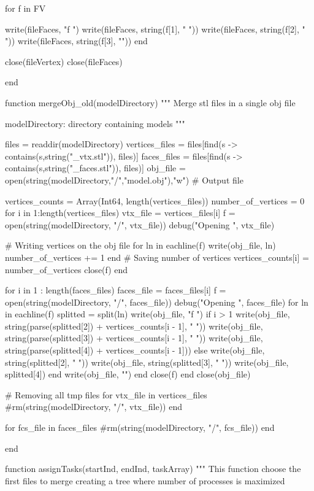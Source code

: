 \documentclass[11pt,oneside]{article}	%
\begin{document}
{  for f in FV

    write(fileFaces, "f ")
    write(fileFaces, string(f[1], " "))
    write(fileFaces, string(f[2], " "))
    write(fileFaces, string(f[3], "\n"))
  end

  close(fileVertex)
  close(fileFaces)

end

function mergeObj_old(modelDirectory)
  """
  Merge stl files in a single obj file

  modelDirectory: directory containing models
  """

  files = readdir(modelDirectory)
  vertices_files = files[find(s -> contains(s,string("_vtx.stl")), files)]
  faces_files = files[find(s -> contains(s,string("_faces.stl")), files)]
  obj_file = open(string(modelDirectory,"/","model.obj"),"w") # Output file

  vertices_counts = Array(Int64, length(vertices_files))
  number_of_vertices = 0
  for i in 1:length(vertices_files)
    vtx_file = vertices_files[i]
    f = open(string(modelDirectory, "/", vtx_file))
    debug("Opening ", vtx_file)

    # Writing vertices on the obj file
    for ln in eachline(f)
      write(obj_file, ln)
      number_of_vertices += 1
    end
    # Saving number of vertices
    vertices_counts[i] = number_of_vertices
    close(f)
  end

  for i in 1 : length(faces_files)
    faces_file = faces_files[i]
    f = open(string(modelDirectory, "/", faces_file))
    debug("Opening ", faces_file)
    for ln in eachline(f)
      splitted = split(ln)
      write(obj_file, "f ")
      if i > 1
        write(obj_file, string(parse(splitted[2]) + vertices_counts[i - 1], " "))
        write(obj_file, string(parse(splitted[3]) + vertices_counts[i - 1], " "))
        write(obj_file, string(parse(splitted[4]) + vertices_counts[i - 1]))
      else
        write(obj_file, string(splitted[2], " "))
        write(obj_file, string(splitted[3], " "))
        write(obj_file, splitted[4])
      end
      write(obj_file, "\n")
    end
    close(f)
  end
  close(obj_file)

  # Removing all tmp files
  for vtx_file in vertices_files
    #rm(string(modelDirectory, "/", vtx_file))
  end

  for fcs_file in faces_files
    #rm(string(modelDirectory, "/", fcs_file))
  end

end

function assignTasks(startInd, endInd, taskArray)
  """
  This function choose the first files to merge
  creating a tree where number of processes is maximized

}
\end{document}
